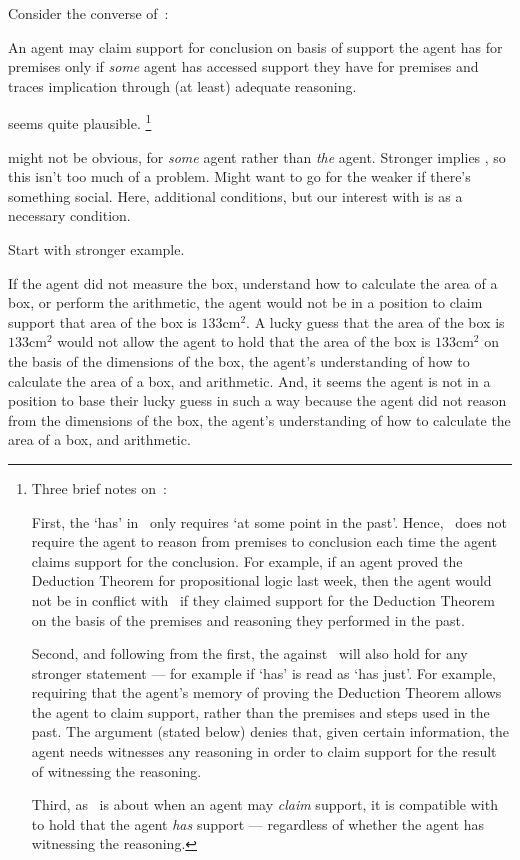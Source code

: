 \begin{note}[Focus]
  Consider the converse of~\bP{}:

  \begin{proposition}[\uRa{-} --- \uRa{}]\label{denied-claim}
    An agent may claim support for conclusion on basis of support the agent has for premises only if \emph{some} agent has accessed support they have for premises and traces implication through (at least) adequate reasoning.
  \end{proposition}

  \uRa{} seems quite plausible.\nolinebreak
  \footnote{
    Three brief notes on~\uRa{}:

    First, the `has' in~\uRa{} only requires `at some point in the past'.
    Hence,~\uRa{} does not require the agent to reason from premises to conclusion each time the agent claims support for the conclusion.
    For example, if an agent proved the Deduction Theorem for propositional logic last week, then the agent would not be in conflict with~\uRa{} if they claimed support for the Deduction Theorem on the basis of the premises and reasoning they performed in the past.

    Second, and following from the first, the against~\uRa{} will also hold for any stronger statement --- for example if `has' is read as `has just'.
    For example, requiring that the agent's memory of proving the Deduction Theorem allows the agent to claim support, rather than the premises and steps used in the past.
    The argument (stated below) denies that, given certain information, the agent needs witnesses any reasoning in order to claim support for the result of witnessing the reasoning.

    Third, as~\uRa{} is about when an agent may \emph{claim} support, it is compatible with~\uRa{} to hold that the agent \emph{has} support --- regardless of whether the agent has witnessing the reasoning.
  }

  \uRa{} might not be obvious, for \emph{some} agent rather than \emph{the} agent.
  Stronger implies \uRa{}, so this isn't too much of a problem.
  Might want to go for the weaker if there's something social.
  Here, additional conditions, but our interest with \uRa{} is as a necessary condition.

  Start with stronger example.

  If the agent did not measure the box, understand how to calculate the area of a box, or perform the arithmetic, the agent would not be in a position to claim support that area of the box is \(133\text{cm}^{2}\).
  A lucky guess that the area of the box is \(133\text{cm}^{2}\) would not allow the agent to hold that the area of the box is  \(133\text{cm}^{2}\) on the basis of the dimensions of the box, the agent's understanding of how to calculate the area of a box, and arithmetic.
  And, it seems the agent is not in a position to base their lucky guess in such a way because the agent did not reason from the dimensions of the box, the agent's understanding of how to calculate the area of a box, and arithmetic.


\end{note}
